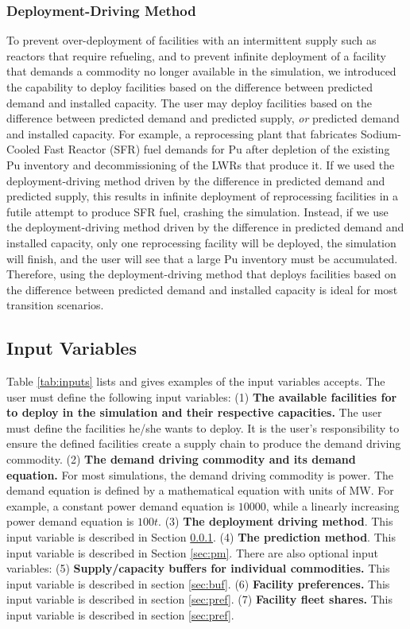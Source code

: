 \subsubsection{Deployment-Driving Method}
\label{sec:ddm}
To prevent over-deployment of facilities with an intermittent 
supply such as reactors that require refueling, and
to prevent infinite deployment of a facility that demands 
a commodity no longer available in the simulation, 
we introduced the capability to deploy facilities 
based on the difference between predicted demand and installed capacity. 
The user may deploy facilities based on the difference 
between predicted demand and predicted supply, \textit{or}
predicted demand and installed capacity. 
For example, a reprocessing plant that fabricates Sodium-Cooled Fast Reactor 
(SFR) fuel demands for Pu after depletion of the existing Pu inventory and 
decommissioning of the LWRs that produce it. 
If we used the deployment-driving method driven by 
the difference in predicted demand and predicted supply, this results in 
infinite deployment of reprocessing facilities in a futile attempt 
to produce SFR fuel, crashing the simulation. 
Instead, if we use the deployment-driving method driven by the
difference in predicted demand and installed capacity, only one reprocessing 
facility will be deployed, the simulation will finish, and the user will see that 
a large Pu inventory must be accumulated. 
Therefore, using the deployment-driving method that deploys facilities based on 
the difference between predicted demand and installed capacity is ideal for most 
transition scenarios. 

\subsection{Input Variables}
Table \ref{tab:inputs} lists and gives examples of the input 
variables \deploy accepts. 
The user must define the following input variables:
(1) \textbf{The available facilities for \deploy to deploy in the simulation and their respective capacities.}
The user must define the facilities he/she wants \deploy to deploy. It is the user's responsibility to 
ensure the defined facilities create a supply chain to produce the demand driving commodity.
(2) \textbf{The demand driving commodity and its demand equation.} For most simulations, the demand driving 
commodity is power. The demand equation is defined by a mathematical equation with units of MW. For example, 
a constant power demand equation is $10000$, while a linearly increasing power demand equation is $100t$.
(3) \textbf{The deployment driving method}. This input variable is described in Section \ref{sec:ddm}.
(4) \textbf{The prediction method}. This input variable is described in Section \ref{sec:pm}.
There are also optional input variables: 
(5) \textbf{Supply/capacity buffers for individual commodities.} This input variable is described in 
section \ref{sec:buf}.
(6) \textbf{Facility preferences.} This input variable is described in section \ref{sec:pref}.
(7) \textbf{Facility fleet shares.} This input variable is described in section \ref{sec:pref}.


